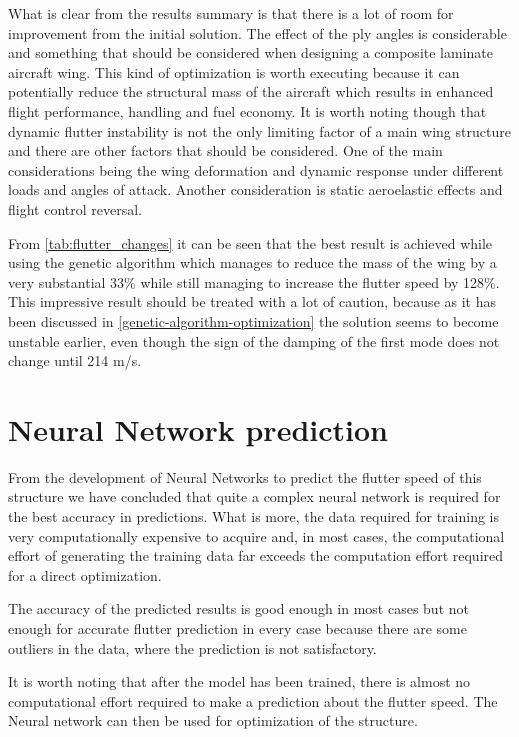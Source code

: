 What is clear from the results summary is that there is a lot of room
for improvement from the initial solution. The effect of the ply angles
is considerable and something that should be considered when designing a
composite laminate aircraft wing. This kind of optimization is worth
executing because it can potentially reduce the structural mass of the
aircraft which results in enhanced flight performance, handling and fuel
economy. It is worth noting though that dynamic flutter instability is
not the only limiting factor of a main wing structure and there are
other factors that should be considered. One of the main considerations
being the wing deformation and dynamic response under different loads
and angles of attack. Another consideration is static aeroelastic
effects and flight control reversal.

From \autoref{tab:flutter_changes} it can be seen that the best result is achieved while using
the genetic algorithm which manages to reduce the mass of the wing by a
very substantial 33\% while still managing to increase the flutter speed
by 128\%. This impressive result should be treated with a lot of
caution, because as it has been discussed in \autoref{genetic-algorithm-optimization} the solution
seems to become unstable earlier, even though the sign of the damping of
the first mode does not change until 214 m/s.

\section{Neural Network prediction}
\label{neural-network-prediction.}

From the development of Neural Networks to predict the flutter speed of
this structure we have concluded that quite a complex neural network is
required for the best accuracy in predictions. What is more, the data
required for training is very computationally expensive to acquire and,
in most cases, the computational effort of generating the training data
far exceeds the computation effort required for a direct optimization.

The accuracy of the predicted results is good enough in most cases but
not enough for accurate flutter prediction in every case because there
are some outliers in the data, where the prediction is not satisfactory.

It is worth noting that after the model has been trained, there is
almost no computational effort required to make a prediction about the
flutter speed. The Neural network can then be used for optimization of
the structure.

